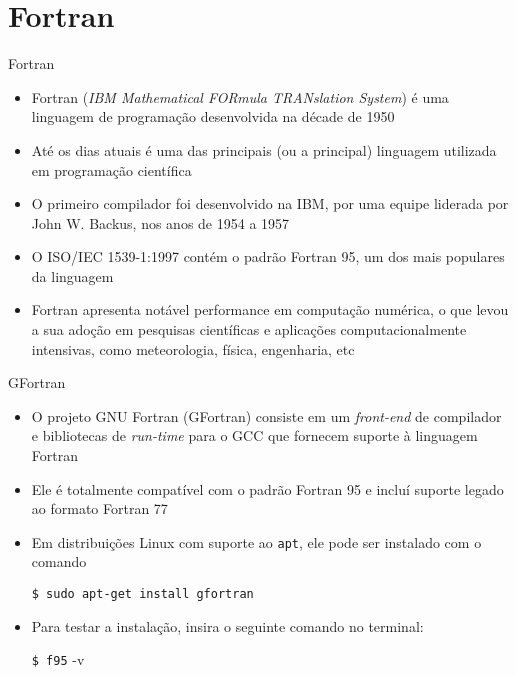 \section{Fortran}

\begin{frame}[fragile]{Fortran}

    \begin{itemize}
        \item Fortran (\textit{IBM Mathematical FORmula TRANslation System}) é uma linguagem de
            programação desenvolvida na décade de 1950 

        \item Até os dias atuais é uma das principais (ou a principal) linguagem utilizada em
            programação científica

        \item O primeiro compilador foi desenvolvido na IBM, por uma equipe liderada por
            John W. Backus, nos anos de 1954 a 1957

        \item O ISO/IEC 1539-1:1997 contém o padrão Fortran 95, um dos mais populares da linguagem

        \item Fortran apresenta notável performance em computação numérica, o que levou a sua
            adoção em pesquisas científicas e aplicações computacionalmente intensivas, como
            meteorologia, física, engenharia, etc
    \end{itemize}

\end{frame}
\begin{frame}[fragile]{GFortran}

    \begin{itemize}
        \item O projeto GNU Fortran (GFortran) consiste em um \textit{front-end} de compilador e 
            bibliotecas de \textit{run-time} para o GCC que fornecem suporte à linguagem Fortran
            
        \item Ele é totalmente compatível com o padrão Fortran 95 e incluí suporte legado ao
            formato Fortran 77

        \item Em distribuições Linux com suporte ao \texttt{apt}, ele pode ser instalado com o
        comando
        \begin{center}
            \verb|$ sudo apt-get install gfortran|
        \end{center}

        \item Para testar a instalação, insira o seguinte comando no terminal:
        \begin{center}
            \verb|$ f95| -v
        \end{center}
    \end{itemize}

\end{frame}


